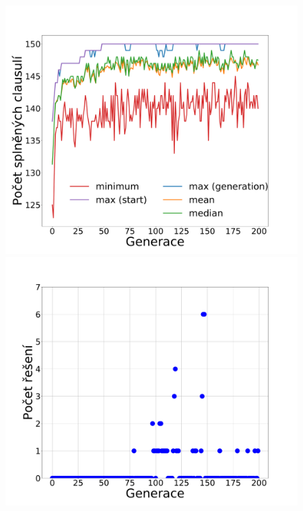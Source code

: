 \documentclass[11pt]{article}
\begin{document}
\begin{figure}
	\centering
    \begin{minipage}[c]{0.48\textwidth}
        \centering\includegraphics[width=\textwidth]{img/runC.pdf} 
    \end{minipage}
    \begin{minipage}[c]{0.48\textwidth}
        \centering \includegraphics[width=\textwidth]{img/runS.pdf} 
    \end{minipage}
    \\

\end{figure}
\end{document}
